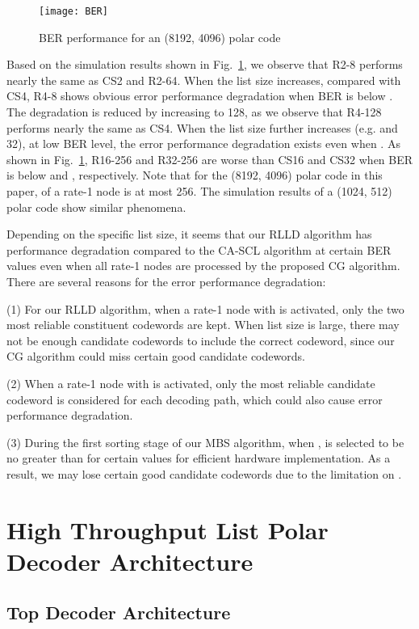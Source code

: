 \documentclass[journal]{IEEEtran}
\begin{document}
\begin{figure} [hbt]
\centering
\texttt{[image: BER]}
  \caption{BER performance for an (8192, 4096) polar code}\label{fig: ber8192}
\end{figure}


Based on the simulation results shown in Fig.~\ref{fig: ber8192}, we observe that R2-8 performs nearly the same as CS2 and R2-64. When the list size increases, compared with CS4, R4-8 shows obvious error performance degradation when BER is below . The degradation is reduced by increasing  to 128, as we observe that R4-128 performs nearly the same as CS4. When the list size further increases (e.g.  and 32), at low BER level, the error performance degradation exists even when . As shown in Fig.~\ref{fig: ber8192}, R16-256 and R32-256 are worse than CS16 and CS32 when BER is below  and , respectively. Note that for the (8192, 4096) polar code in this paper,  of a rate-1 node is at most 256. The simulation results of a (1024, 512) polar code show similar phenomena.

Depending on the specific list size, it seems that our RLLD algorithm has performance degradation compared to the CA-SCL algorithm at certain BER values even when all rate-1 nodes are processed by the proposed CG algorithm.
There are several reasons for the error performance degradation:

(1) For our RLLD algorithm, when a rate-1 node with  is activated, only the two most reliable constituent codewords are kept. When list size  is large, there may not be enough candidate codewords to include the correct codeword, since our CG algorithm could miss certain good candidate codewords.

(2) When a rate-1 node with  is activated, only the most reliable candidate codeword is considered for each decoding path, which could also cause error performance degradation.

(3) During the first sorting stage of our MBS algorithm, when ,  is selected to be no greater than  for certain  values for efficient hardware implementation. As a result, we may lose certain good candidate codewords due to the limitation on .


\section{High Throughput List Polar Decoder Architecture} \label{sec: llldec}
\subsection{Top Decoder Architecture} \label{ssec: top_archi}
\end{document}
